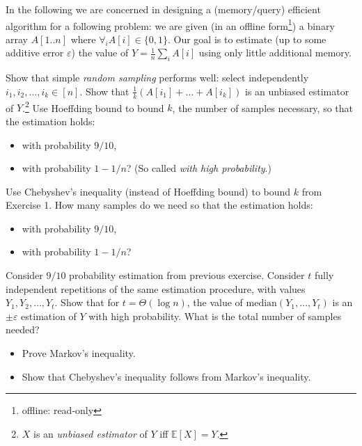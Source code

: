 \documentclass[12pt]{uebung}
\begin{document}
 


\renewcommand{\aufgname}{Exercise}





In the following we are concerned in designing a (memory/query) efficient algorithm for a following problem: we are given (in an offline form\footnote{offline: read-only}) a binary array $A[1 .. n]$ where $\forall_i A[i] \in \{0,1\}$. Our goal is to estimate (up to some additive error $\varepsilon$) the value of $Y = \frac{1}{n}\sum_i A[i]$ using only little additional memory.

\begin{aufg}[2 pts]
Show that simple \emph{random sampling} performs well: select independently $i_1,i_2,\ldots,i_k \in [n]$. Show that $\frac{1}{k}(A[i_1]+\ldots+A[i_k])$ is an unbiased estimator of $Y$.\footnote{$X$ is an \emph{unbiased estimator} of $Y$ iff $\mathbb{E}[X] = Y$.} Use Hoeffding bound to bound $k$, the number of samples necessary, so that the estimation holds:
\begin{itemize}
\item with probability $9/10$,
\item with probability $1-1/n$? (So called \emph{with high probability}.)
\end{itemize}
\end{aufg}

\begin{aufg}[2 pts]
Use Chebyshev's inequality (instead of Hoeffding bound) to bound $k$ from Exercise 1. How many samples do we need so that the estimation holds:
\begin{itemize}
\item with probability $9/10$,
\item with probability $1-1/n$?
\end{itemize}
\end{aufg}

\begin{aufg}[2 pts]
Consider $9/10$ probability estimation from previous exercise. Consider $t$ fully independent repetitions of the same estimation procedure, with values $Y_1,Y_2,\ldots,Y_t$. Show that for $t=\Theta(\log n)$, the value of $\textrm{median}(Y_1,\ldots,Y_t)$ is an $\pm \varepsilon$ estimation of $Y$ with high probability.
What is the total number of samples needed?
\end{aufg}

\begin{aufg}[2 pts]
\begin{itemize}
\item Prove Markov's inequality. 
\item Show that Chebyshev's inequality follows from Markov's inequality.
\end{itemize}
\end{aufg}
\end{document}
